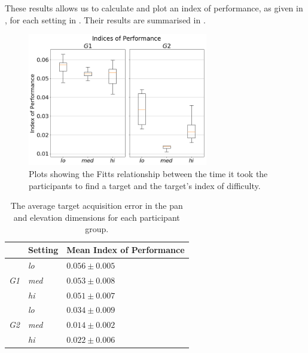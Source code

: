 \documentclass[]{interact}
\begin{document}
These results allows us to calculate and plot an index of performance, as given in , for each setting in .
Their results are summarised in .

\begin{figure}
  \centering
  \includegraphics[width=0.7\textwidth]{figures/fitts_ips.png}
  \caption{Plots showing the Fitts relationship between the time it took the participants to find a target and the target's index of difficulty. }\label{fig:fitts-ips}
\end{figure}

\begin{table}
  \centering
  \caption{The average target acquisition error in the pan and elevation dimensions for each participant group. }\label{tab:fitts-results}
  \begin{tabular}{p{0.5cm}p{1.2cm}p{2.3cm}}
    \toprule
    & Setting      & Mean Index of Performance \\ \midrule
    & \textit{lo}  & $0.056\pm0.005$ \\
    \textit{G1} & \textit{med} & $0.053\pm0.008$ \\
		& \textit{hi}  & $0.051\pm0.007$ \\ \cline{2-3}
    & \textit{lo}  & $0.034\pm0.009$ \\
    \textit{G2} & \textit{med} & $0.014\pm0.002$ \\
    & \textit{hi}  & $0.022\pm0.006$ \\
    \bottomrule
  \end{tabular}
\end{table}
\end{document}
